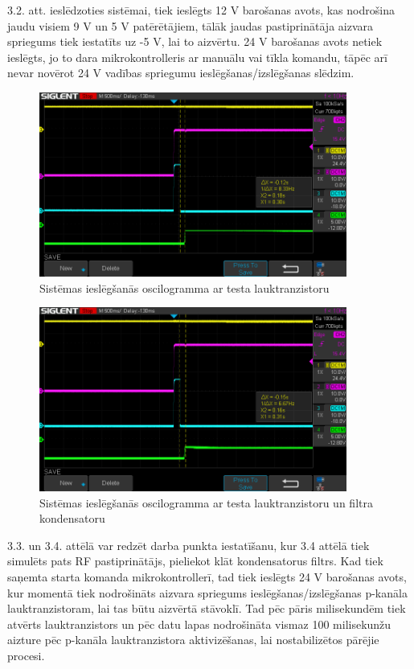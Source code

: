  3.2. att. ieslēdzoties sistēmai, tiek ieslēgts 12 V barošanas avots, kas nodrošina jaudu visiem 9 V un 5 V patērētājiem, tālāk jaudas pastiprinātāja aizvara spriegums tiek iestatīts uz -5 V, lai to aizvērtu. 24 V barošanas avots netiek ieslēgts, jo to dara  mikrokontrolleris ar manuālu vai tīkla komandu, tāpēc arī nevar novērot 24 V vadības spriegumu ieslēgšanas/izslēgšanas slēdzim.
\begin{figure}[H]
	\centering
    \includegraphics[width=0.9\textwidth]{pictures/load_nocap.png}\hspace{1cm}
    \caption{Sistēmas ieslēgšanās oscilogramma ar testa lauktranzistoru}
\end{figure}
\begin{figure}[H]
	\centering
    \includegraphics[width=0.9\textwidth]{pictures/capacitive_load.png}\hspace{1cm}
    \caption{Sistēmas ieslēgšanās oscilogramma ar testa lauktranzistoru un filtra kondensatoru}
\end{figure}
3.3. un 3.4. attēlā var redzēt darba punkta iestatīšanu, kur 3.4 attēlā tiek simulēts pats RF pastiprinātājs, pieliekot klāt kondensatorus filtrs. Kad tiek saņemta starta komanda mikrokontrollerī, tad tiek ieslēgts 24 V barošanas avots, kur momentā tiek nodrošināts aizvara spriegums ieslēgšanas/izslēgšanas p-kanāla lauktranzistoram, lai tas būtu aizvērtā stāvoklī. Tad pēc pāris milisekundēm tiek atvērts lauktranzistors un pēc datu lapas nodrošināta vismaz 100 milisekunžu aizture pēc p-kanāla lauktranzistora aktivizēšanas, lai nostabilizētos pārējie procesi.
